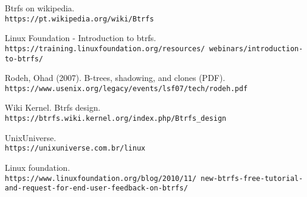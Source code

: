 \documentclass[12pt]{article}
\begin{document}
\begin{thebibliography}{9}

Btrfs on wikipedia.
\\\texttt{https://pt.wikipedia.org/wiki/Btrfs}

Linux Foundation - Introduction to btrfs.
\\\texttt{https://training.linuxfoundation.org/resources/\
webinars/introduction-to-btrfs/}

Rodeh, Ohad (2007). B-trees, shadowing, and clones (PDF). 
\\\texttt{https://www.usenix.org/legacy/events/lsf07/tech/rodeh.pdf}

Wiki Kernel. Btrfs design.
\\\texttt{https://btrfs.wiki.kernel.org/index.php/Btrfs_design}

UnixUniverse.
\\\texttt{https://unixuniverse.com.br/linux}

Linux foundation.
\\\texttt{https://www.linuxfoundation.org/blog/2010/11/\
new-btrfs-free-tutorial-and-request-for-end-user-feedback-on-btrfs/}

\end{thebibliography}
\end{document}
